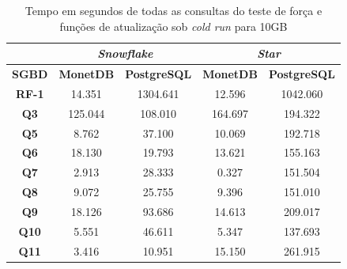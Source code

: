 \begin{table}[htpb]
        \centering
        \caption{Tempo em segundos de todas as consultas do teste de força e funções de atualização sob \textit{cold run} para 10GB}
        \label{tab:queries_cold_10}
        \begin{tabular}{|c|c|c|c|c|} 
                \cline{2-5}
                \multicolumn{1}{c|}{} & \multicolumn{2}{c|}{\textit{\textbf{Snowflake}} } & \multicolumn{2}{c|}{\textit{\textbf{Star}} }  \\ 
                \hline
                 \textbf{SGBD}        & \textbf{MonetDB}  & \textbf{PostgreSQL}           & \textbf{MonetDB}  & \textbf{PostgreSQL}       \\ 
                \hline
                 \textbf{RF-1}        & 14.351            & 1304.641                      & 12.596            & 1042.060                  \\ 
                \hline
                 \textbf{Q3}          & 125.044           & 108.010                       & 164.697           & 194.322                   \\ 
                \hline
                 \textbf{Q5}          & 8.762             & 37.100                        & 10.069            & 192.718                   \\ 
                \hline
                 \textbf{Q6}          & 18.130            & 19.793                        & 13.621            & 155.163                   \\ 
                \hline
                 \textbf{Q7}          & 2.913             & 28.333                        & 0.327             & 151.504                   \\ 
                \hline
                 \textbf{Q8}          & 9.072             & 25.755                        & 9.396             & 151.010                   \\ 
                \hline
                 \textbf{Q9}          & 18.126            & 93.686                        & 14.613            & 209.017                   \\ 
                \hline
                 \textbf{Q10}         & 5.551             & 46.611                        & 5.347             & 137.693                   \\ 
                \hline
                 \textbf{Q11}         & 3.416             & 10.951                        & 15.150            & 261.915                   \\ 
                \hline

\end{tabular}
\end{table}
